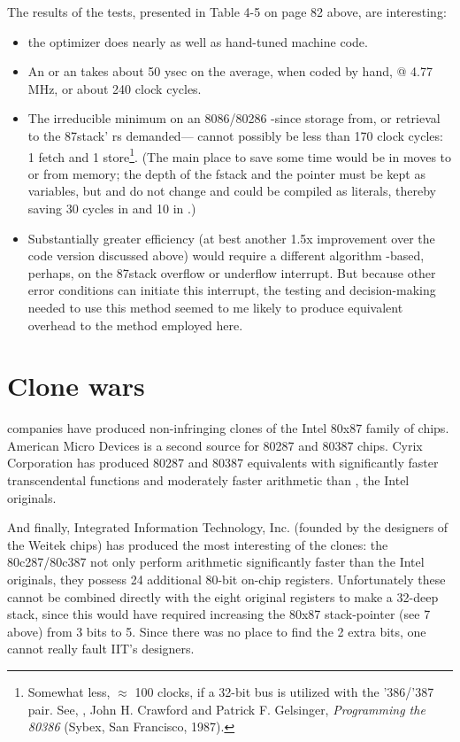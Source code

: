 The results of the tests, presented in Table 4-5 on page 82 above,
are interesting:
\begin{itemize}
    \item the optimizer does nearly as well as hand-tuned machine code.
    \item An  or an  takes about 50 ysec on the average, when coded by hand, @ 4.77 MHz, or about 240 clock cycles.
    \item The irreducible minimum on an 8086/80286 -since  storage from, or retrieval to the 87stack' rs demanded— cannot possibly be less than 170 clock cycles: 1 fetch and 1 store\footnote{Somewhat less, $\approx$ 100 clocks, if a 32-bit bus is utilized with the '386/'387 pair. See, \eg, John H. Crawford and Patrick F. Gelsinger, \textit{Programming the 80386} (Sybex, San Francisco, 1987).}. (The main place to save some time would be in moves to or from memory; the depth of the fstack and the pointer must be kept as variables, but  and  do not change and could be compiled as literals, thereby saving 30 cycles in  and 10 in .)
    \item Substantially greater efficiency (at best another 1.5x improvement over the code version discussed above) would require a different algorithm -based, perhaps, on the 87stack overflow or underflow interrupt. But because other error conditions can initiate this interrupt, the testing and decision-making needed to use this method seemed to me likely to produce equivalent overhead to the method employed here.
\end{itemize}
\section{Clone wars}

 companies have produced non-infringing clones of the Intel 80x87 family of chips. American Micro Devices is a second source for 80287 and 80387 chips. Cyrix Corporation has produced 80287 and 80387 equivalents with significantly faster transcendental functions and moderately faster arithmetic than , the Intel originals.

And finally, Integrated Information Technology, Inc. (founded by the designers of the Weitek chips) has produced the most interesting of the clones: the 80c287/80c387 not only perform arithmetic significantly faster than the Intel originals, they possess 24 additional 80-bit on-chip registers. Unfortunately these cannot be combined directly with the eight original registers to make a 32-deep stack, since this would have required increasing the 80x87 stack-pointer (see 7 above) from 3 bits to 5. Since there was no place to find the 2 extra bits, one cannot really fault IIT's designers.


